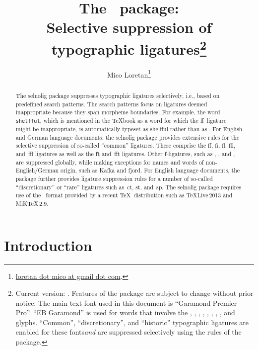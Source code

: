\documentclass[11pt]{article}
\title{The \selnoligpackagename\ package: \\
Selective suppression of typographic ligatures\thanks{
Current version: \selnoligpackageversion. Features of the \pkg{selnolig} package are subject to change without prior notice. 
\newline\hspace*{\parindent}
The main text font used in this document is \enquote{Garamond Premier Pro}. \enquote{\ebg EB Garamond} is used for words that involve the {\ebg\uselig{fb}, \uselig{fh}, \uselig{fj}, \uselig{fk}, \uselig{ffb}, \uselig{ffh}, \uselig{ffj}, \uselig{ffk}, and \emph{\uselig{sk}}} glyphs. \enquote{Common}, \enquote{discretionary}, and \enquote{historic} typographic ligatures are enabled for these fonts\textemdash \emph{and} are suppressed selectively using the rules of the \pkg{selnolig} package.}}
\author{Mico Loretan\thanks{
\href{mailto:loretan.mico@gmail.com}{loretan dot mico at gmail dot com}.}}
\date{\selnoligpackagedate}
\newcommand{\pkg}[1]{\textsf{#1}}
\newcommand{\opt}[1]{\texttt{#1}}
\begin{document}
\VerbatimFootnotes
{}

\selnoligoff
\maketitle
\selnoligon


\begin{abstract}

The \pkg{selnolig} package suppresses typographic ligatures selectively, i.e., based on predefined search patterns. The search patterns focus on ligatures deemed inappropriate because they span morpheme boundaries. For example, the word \opt{shelfful}, which is mentioned in the \TeX book as a word for which the ff~ligature might be inappropriate, is automatically typeset as shelfful rather than as .
\newline\hspace*{\parindent}
For English and German language documents, the \pkg{selnolig} package provides extensive rules for the selective suppression of so-called \enquote{common} ligatures. These comprise the ff, fi, fl, ffi, and~ffl ligatures as well as the ft and~fft ligatures. Other f-ligatures, such as {\ebg{}}, {\ebg{}}, {\ebg{}} and {\ebg{}}, are suppressed globally, while making exceptions for names and words of non-English/German origin, such as {\ebg Kafka} and {\ebg fjord}.
\newline\hspace*{\parindent}
For English language documents, the package further provides ligature suppression rules for a number of so-called \enquote{discretionary} or \enquote{rare} ligatures such as~ct, st, and~sp.
\newline\hspace*{\parindent}
The \pkg{selnolig} package requires use of the \LuaLaTeX\ format provided by a recent \TeX\ distribution such as \TeX Live\,2013 and MiK\TeX\,2.9.
\end{abstract}

\tableofcontents

\clearpage
{}

\section{Introduction}
\end{document}
